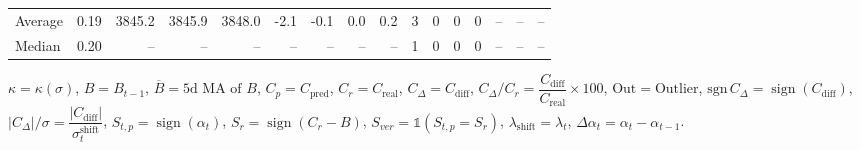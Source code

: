 \begin{threeparttable}
{\begin{tabular}{lrrrrrrrrrrrrrrr}
Average &     0.19 & 3845.2 & 3845.9 & 3848.0 &       -2.1 &           -0.1 &                      0.0 &                 0.2 &              3 &         0 &     0 &         0 &         -- &        -- &             -- \\
 Median &     0.20 &     -- &     -- &     -- &         -- &             -- &                       -- &                  -- &              1 &         0 &     0 &         0 &         -- &        -- &             -- \\
\bottomrule
\end{tabular}
}
\begin{tablenotes}\footnotesize
\item $\kappa=\kappa(\sigma)$, $B=B_{t-1}$, $\overline{B}=\text{5d MA of }B$, $C_p=C_{\text{pred}}$, $C_r=C_{\text{real}}$, $C_\Delta=C_{\text{diff}}$, $C_\Delta/C_r=\dfrac{C_{\text{diff}}}{C_{\text{real}}}\times100$, $\mathrm{Out}=\text{Outlier}$, $\mathrm{sgn}\,C_\Delta=\operatorname{sign}(C_{\text{diff}})$, $|C_\Delta|/\sigma=\dfrac{|C_{\text{diff}}|}{\sigma_t^{\text{shift}}}$, $S_{t,p}=\operatorname{sign}(\alpha_t)$, $S_r=\operatorname{sign}(C_r - B)$, $S_{ver}=\mathbb{1}(S_{t,p}=S_r)$, $\lambda_{\text{shift}}=\lambda_t$, $\Delta\alpha_t=\alpha_t-\alpha_{t-1}$.\end{tablenotes}
\end{threeparttable}
\endgroup

